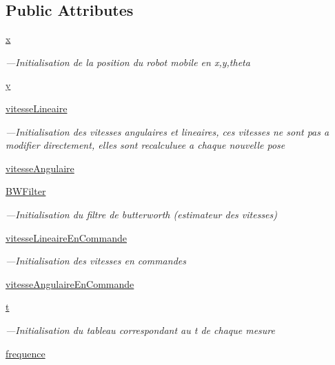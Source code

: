 \subsection*{Public Attributes}
\begin{DoxyCompactItemize}
\item 
\hyperlink{classcmd__TTB_1_1dataGatherer_1_1DataGatherer_a088d7c0901296ea4bca154bab6c76aa9}{x}
\begin{DoxyCompactList}\small\item\em ---Initialisation de la position du robot mobile en x,y,theta \end{DoxyCompactList}\item 
\hyperlink{classcmd__TTB_1_1dataGatherer_1_1DataGatherer_a3b8b2b639cad9c1192ef10efa68f2b51}{y}
\item 
\hyperlink{classcmd__TTB_1_1dataGatherer_1_1DataGatherer_a5d41f95d517db30b08d462522c3d973a}{vitesse\+Lineaire}
\begin{DoxyCompactList}\small\item\em ---Initialisation des vitesses angulaires et lineaires, ces vitesses ne sont pas a modifier directement, elles sont recalculuee a chaque nouvelle pose \end{DoxyCompactList}\item 
\hyperlink{classcmd__TTB_1_1dataGatherer_1_1DataGatherer_afc9fa9a763fe0ff962f1fc9aa8e33e33}{vitesse\+Angulaire}
\item 
\hyperlink{classcmd__TTB_1_1dataGatherer_1_1DataGatherer_a096d1a4edcb1a9189ebfbea80cb646b5}{B\+W\+Filter}
\begin{DoxyCompactList}\small\item\em ---Initialisation du filtre de butterworth (estimateur des vitesses) \end{DoxyCompactList}\item 
\hyperlink{classcmd__TTB_1_1dataGatherer_1_1DataGatherer_a92c6e630cfff49229d514a0ea1a26ce1}{vitesse\+Lineaire\+En\+Commande}
\begin{DoxyCompactList}\small\item\em ---Initialisation des vitesses en commandes \end{DoxyCompactList}\item 
\hyperlink{classcmd__TTB_1_1dataGatherer_1_1DataGatherer_adf0b4f8826e0178d2a8fa681673f9284}{vitesse\+Angulaire\+En\+Commande}
\item 
\hyperlink{classcmd__TTB_1_1dataGatherer_1_1DataGatherer_a402999c8fcfdd46884f1afd92b3b2a9d}{t}
\begin{DoxyCompactList}\small\item\em ---Initialisation du tableau correspondant au t de chaque mesure \end{DoxyCompactList}\item 
\hyperlink{classcmd__TTB_1_1dataGatherer_1_1DataGatherer_ab3e9d78d3f2a56d97dc60dba0cd6e79d}{frequence}
\end{DoxyCompactItemize}
